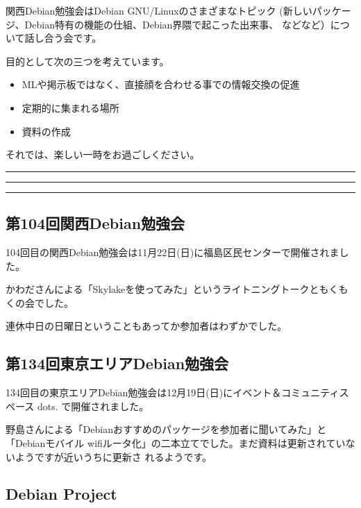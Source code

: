 \documentclass[mingoth,a4paper]{jsarticle}
\begin{document}
 関西Debian勉強会はDebian GNU/Linuxのさまざまなトピック
 (新しいパッケージ、Debian特有の機能の仕組、Debian界隈で起こった出来事、
 などなど）について話し合う会です。

 目的として次の三つを考えています。
 \begin{itemize}
  \item MLや掲示板ではなく、直接顔を合わせる事での情報交換の促進
  \item 定期的に集まれる場所
  \item 資料の作成
 \end{itemize}

 それでは、楽しい一時をお過ごしください。

\newpage

\begin{minipage}[b]{0.2\hsize}
 {}
\end{minipage}
\begin{minipage}[b]{0.8\hsize}
\hrule
\vspace{2mm}
\hrule
\setcounter{tocdepth}{1}
\tableofcontents
\vspace{2mm}
\hrule
\end{minipage}


\subsection{第104回関西Debian勉強会}

104回目の関西Debian勉強会は11月22日(日)に福島区民センターで開催されました。

かわださんによる「Skylakeを使ってみた」というライトニングトークともくもくの会でした。

連休中日の日曜日ということもあってか参加者はわずかでした。

\subsection{第134回東京エリアDebian勉強会}

134回目の東京エリアDebian勉強会は12月19日(日)にイベント＆コミュニティスペース dots.
で開催されました。

野島さんによる「Debianおすすめのパッケージを参加者に聞いてみた」と「Debianモバイル
wifiルータ化」の二本立てでした。まだ資料は更新されていないようですが近いうちに更新さ
れるようです。

\subsection{Debian Project}
\end{document}

